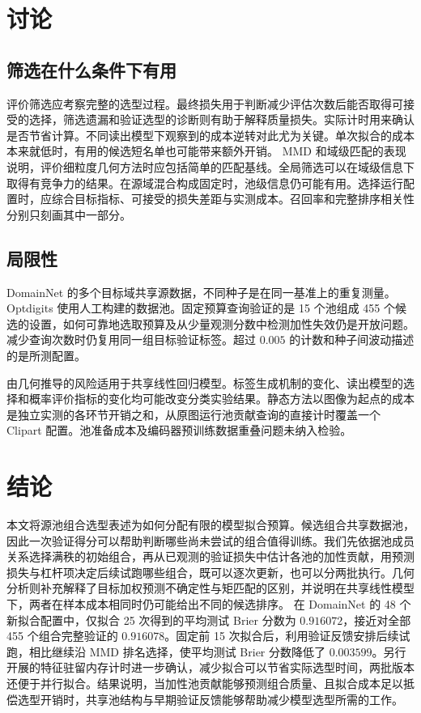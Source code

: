 \documentclass[UTF8,fontset=fandol,scheme=chinese,zihao=false,11pt,letterpaper]{ctexart}
\begin{document}
\section{讨论}
\label{sec:discussion}
\subsection{筛选在什么条件下有用}
评价筛选应考察完整的选型过程。最终损失用于判断减少评估次数后能否取得可接受的选择，筛选遗漏和验证选型的诊断则有助于解释质量损失。实际计时用来确认是否节省计算。不同读出模型下观察到的成本逆转对此尤为关键。单次拟合的成本本来就低时，有用的候选短名单也可能带来额外开销。
MMD 和域级匹配的表现说明，评价细粒度几何方法时应包括简单的匹配基线。全局筛选可以在域级信息下取得有竞争力的结果。在源域混合构成固定时，池级信息仍可能有用。选择运行配置时，应综合目标指标、可接受的损失差距与实测成本。召回率和完整排序相关性分别只刻画其中一部分。

\subsection{局限性}
\label{sec:limitations}
DomainNet 的多个目标域共享源数据，不同种子是在同一基准上的重复测量。Optdigits 使用人工构建的数据池。固定预算查询验证的是 15 个池组成 455 个候选的设置，如何可靠地选取预算及从少量观测分数中检测加性失效仍是开放问题。减少查询次数时仍复用同一组目标验证标签。超过 $0.005$ 的计数和种子间波动描述的是所测配置。

由几何推导的风险适用于共享线性回归模型。标签生成机制的变化、读出模型的选择和概率评价指标的变化均可能改变分类实验结果。静态方法以图像为起点的成本是独立实测的各环节开销之和，从原图运行池贡献查询的直接计时覆盖一个 Clipart 配置。池准备成本及编码器预训练数据重叠问题未纳入检验。

\section{结论}
\label{sec:conclusion}
本文将源池组合选型表述为如何分配有限的模型拟合预算。候选组合共享数据池，因此一次验证得分可以帮助判断哪些尚未尝试的组合值得训练。我们先依据池成员关系选择满秩的初始组合，再从已观测的验证损失中估计各池的加性贡献，用预测损失与杠杆项决定后续试跑哪些组合，既可以逐次更新，也可以分两批执行。几何分析则补充解释了目标加权预测不确定性与矩匹配的区别，并说明在共享线性模型下，两者在样本成本相同时仍可能给出不同的候选排序。 在 DomainNet 的 48 个新拟合配置中，仅拟合 25 次得到的平均测试 Brier 分数为 $0.916072$，接近对全部 455 个组合完整验证的 $0.916078$。固定前 15 次拟合后，利用验证反馈安排后续试跑，相比继续沿 MMD 排名选择，使平均测试 Brier 分数降低了 $0.003599$。另行开展的特征驻留内存计时进一步确认，减少拟合可以节省实际选型时间，两批版本还便于并行拟合。结果说明，当加性池贡献能够预测组合质量、且拟合成本足以抵偿选型开销时，共享池结构与早期验证反馈能够帮助减少模型选型所需的工作。
\end{document}
